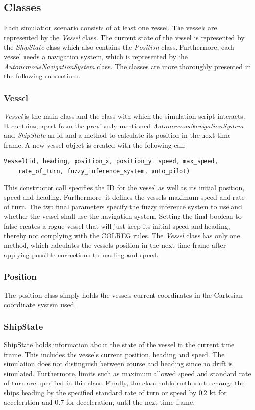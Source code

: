 \subsection{Classes}
Each simulation scenario consists of at least one vessel. The vessels are represented by the \textit{Vessel} class. The current state of the vessel is represented by the \textit{ShipState} class which also contains the \textit{Position} class. Furthermore, each vessel needs a navigation system, which is represented by the \textit{AutonomousNavigationSystem} class. The classes are  more thoroughly presented in the following subsections.
\subsubsection{Vessel}
\textit{Vessel} is the main class and the class with which the simulation script interacts.
It contains, apart from the previously mentioned \textit{AutonomousNavigationSystem} and \textit{ShipState} an id and a method to calculate its position in the next time frame.
A new vessel object is created with the following call:
\begin{verbatim}
Vessel(id, heading, position_x, position_y, speed, max_speed, 
    rate_of_turn, fuzzy_inference_system, auto_pilot)
\end{verbatim}
This constructor call specifies the ID for the vessel as well as its initial position, speed and heading. Furthermore, it defines the vessels maximum speed and rate of turn. The two final parameters specify the fuzzy inference system to use and whether the vessel shall use the navigation system. Setting the final boolean to false creates a rogue vessel that will just keep its initial speed and heading, thereby not complying with the COLREG rules. The \textit{Vessel} class has only one method, which calculates the vessels position in the next time frame after applying possible corrections to heading and speed.
\subsubsection{Position}
The position class simply holds the vessels current coordinates in the Cartesian coordinate system used.
\subsubsection{ShipState}
ShipState holds information about the state of the vessel in the current time frame. This includes the vessels current position, heading and speed. The simulation does not distinguish between course and heading since no drift is simulated.
Furthermore, limits such as maximum allowed speed and standard rate of turn are specified in this class. Finally, the class holds methods to change the ships heading by the specified standard rate of turn or speed by 0.2 kt for acceleration and 0.7 for deceleration, until the next time frame.


